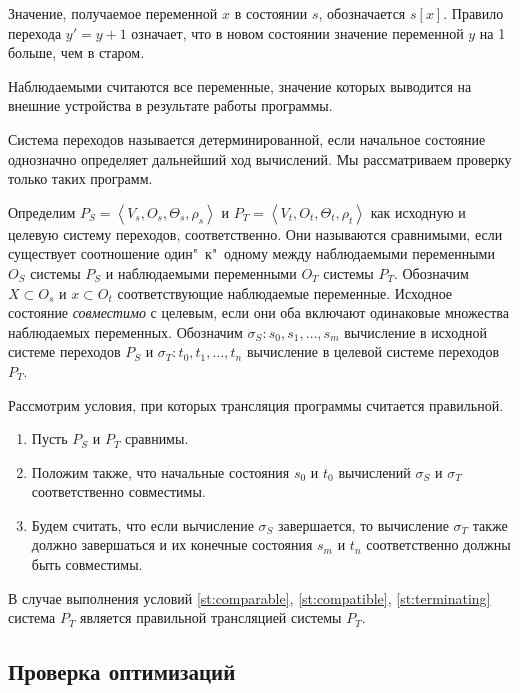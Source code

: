 Значение, получаемое переменной $x$ в состоянии $s$, обозначается $s[x]$. Правило перехода $y' = y + 1$ означает, что в новом состоянии значение переменной $y$ на 1 больше, чем в старом.

Наблюдаемыми считаются все переменные, значение которых выводится на внешние устройства в результате работы программы.

Система переходов называется детерминированной, если начальное состояние однозначно определяет дальнейший ход вычислений. Мы рассматриваем проверку только таких программ.

Определим $P_{S} = \left\langle  V_{s}, O_{s}, \Theta_{s}, \rho_{s} \right\rangle $ и $P_{T} = \left\langle  V_{t}, O_{t}, \Theta_{t}, \rho_{t} \right\rangle $ как исходную и целевую систему переходов, соответственно. 
Они называются сравнимыми, если существует соотношение один"~к"~одному между наблюдаемыми переменными $O_{S}$ системы $P_{S}$ и наблюдаемыми переменными $O_{T}$ системы $P_{T}$. Обозначим $ X \subset O_{s} $ и $ x \subset O_{t} $ соответствующие наблюдаемые переменные. 
Исходное состояние \emph{совместимо} с целевым, если они оба включают одинаковые множества наблюдаемых переменных. Обозначим $\sigma_{S}: s_{0}, s_{1}, \ldots, s_{m}$ вычисление в исходной системе переходов $P_{S}$ и $\sigma_{T}: t_{0}, t_{1}, \ldots, t_{n}$ вычисление в целевой системе переходов $P_{T}$. 

{
    Рассмотрим условия, при которых трансляция программы считается правильной.
    \begin{enumerate}
        \item {Пусть $P_{S}$ и $P_{T}$ сравнимы. \label{st:comparable}}
        \item {Положим также, что начальные состояния $s_{0}$ и $t_{0}$ вычислений $\sigma_{S}$ и $\sigma_{T}$ соответственно совместимы. \label{st:compatible}}
        \item {Будем считать, что если вычисление $\sigma_{S}$ завершается, то вычисление $\sigma_{T}$ также должно завершаться и их конечные состояния $s_{m}$ и $t_{n}$ соответственно должны быть совместимы. \label{st:terminating}}
    \end{enumerate}
    
    В случае выполнения условий \ref{st:comparable}, \ref{st:compatible}, \ref{st:terminating} система $P_{T}$ является правильной трансляцией системы $P_{T}$.
}

\subsection{Проверка оптимизаций}
\label{ss:validate}


